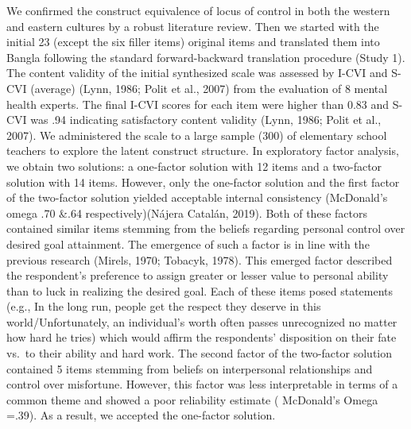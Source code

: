 \documentclass[
  man]{apa6}
\begin{document}
We confirmed the construct equivalence of locus of control in both the western and eastern cultures by a robust literature review. Then we started with the initial 23 (except the six filler items) original items and translated them into Bangla following the standard forward-backward translation procedure (Study 1). The content validity of the initial synthesized scale was assessed by I-CVI and S-CVI (average) (Lynn, 1986; Polit et al., 2007) from the evaluation of 8 mental health experts. The final I-CVI scores for each item were higher than 0.83 and S-CVI was .94 indicating satisfactory content validity (Lynn, 1986; Polit et al., 2007). We administered the scale to a large sample (300) of elementary school teachers to explore the latent construct structure. In exploratory factor analysis, we obtain two solutions: a one-factor solution with 12 items and a two-factor solution with 14 items. However, only the one-factor solution and the first factor of the two-factor solution yielded acceptable internal consistency (McDonald's omega .70 \&.64 respectively)(Nájera Catalán, 2019). Both of these factors contained similar items stemming from the beliefs regarding personal control over desired goal attainment. The emergence of such a factor is in line with the previous research (Mirels, 1970; Tobacyk, 1978). This emerged factor described the respondent's preference to assign greater or lesser value to personal ability than to luck in realizing the desired goal. Each of these items posed statements (e.g., In the long run, people get the respect they deserve in this world/Unfortunately, an individual's worth often passes unrecognized no matter how hard he tries) which would affirm the respondents' disposition on their fate vs.~to their ability and hard work. The second factor of the two-factor solution contained 5 items stemming from beliefs on interpersonal relationships and control over misfortune. However, this factor was less interpretable in terms of a common theme and showed a poor reliability estimate ( McDonald's Omega =.39). As a result, we accepted the one-factor solution.
\end{document}
